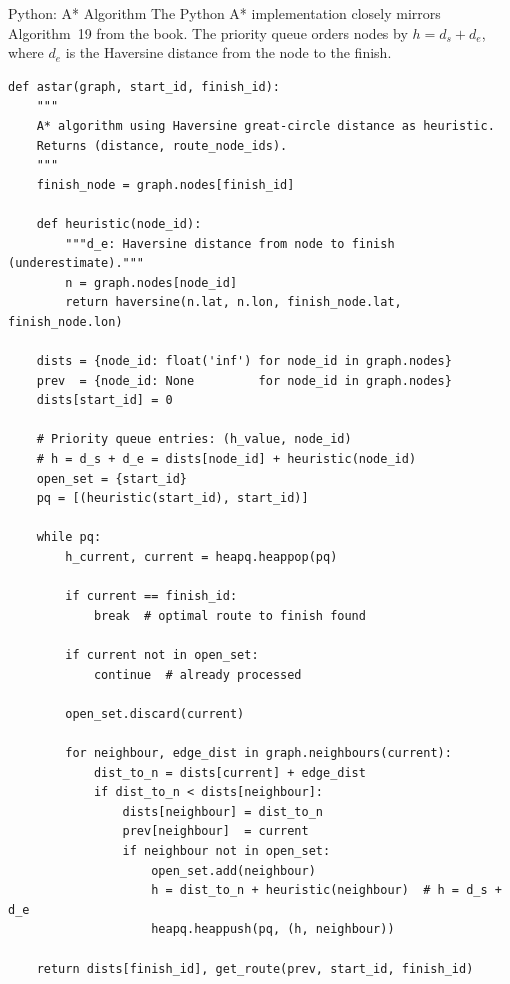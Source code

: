 \documentclass[aspectratio=169,10pt]{beamer}
\begin{document}
\begin{frame}[fragile]{Python: A* Algorithm}
  The Python A* implementation closely mirrors Algorithm~19 from the book.
  The priority queue orders nodes by $h = d_s + d_e$, where $d_e$ is
  the Haversine distance from the node to the finish.

\begin{lstlisting}[style=pythoncode]
def astar(graph, start_id, finish_id):
    """
    A* algorithm using Haversine great-circle distance as heuristic.
    Returns (distance, route_node_ids).
    """
    finish_node = graph.nodes[finish_id]

    def heuristic(node_id):
        """d_e: Haversine distance from node to finish (underestimate)."""
        n = graph.nodes[node_id]
        return haversine(n.lat, n.lon, finish_node.lat, finish_node.lon)

    dists = {node_id: float('inf') for node_id in graph.nodes}
    prev  = {node_id: None         for node_id in graph.nodes}
    dists[start_id] = 0

    # Priority queue entries: (h_value, node_id)
    # h = d_s + d_e = dists[node_id] + heuristic(node_id)
    open_set = {start_id}
    pq = [(heuristic(start_id), start_id)]

    while pq:
        h_current, current = heapq.heappop(pq)

        if current == finish_id:
            break  # optimal route to finish found

        if current not in open_set:
            continue  # already processed

        open_set.discard(current)

        for neighbour, edge_dist in graph.neighbours(current):
            dist_to_n = dists[current] + edge_dist
            if dist_to_n < dists[neighbour]:
                dists[neighbour] = dist_to_n
                prev[neighbour]  = current
                if neighbour not in open_set:
                    open_set.add(neighbour)
                    h = dist_to_n + heuristic(neighbour)  # h = d_s + d_e
                    heapq.heappush(pq, (h, neighbour))

    return dists[finish_id], get_route(prev, start_id, finish_id)
\end{lstlisting}
\end{frame}
\end{document}

